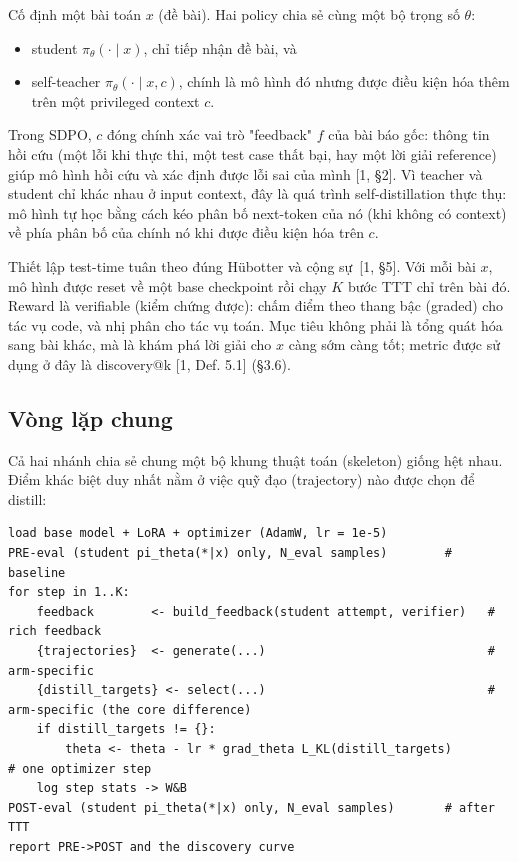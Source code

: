 Cố định một bài toán \(x\) (đề bài). Hai policy chia sẻ cùng một bộ trọng số \(\theta\):

\begin{itemize}
\tightlist
\item
  student \(\pi_\theta(\cdot \mid x)\), chỉ tiếp nhận đề bài, và
\item
  self-teacher \(\pi_\theta(\cdot \mid x, c)\), chính là mô hình đó nhưng được điều kiện hóa thêm trên một privileged context \(c\).
\end{itemize}

Trong SDPO, \(c\) đóng chính xác vai trò "feedback" \(f\) của bài báo gốc: thông tin hồi cứu (một lỗi khi thực thi, một test case thất bại, hay một lời giải reference) giúp mô hình hồi cứu và xác định được lỗi sai của mình {[}1, §2{]}. Vì teacher và student chỉ khác nhau ở input context, đây là quá trình self-distillation thực thụ: mô hình tự học bằng cách kéo phân bố next-token của nó (khi không có context) về phía phân bố của chính nó khi được điều kiện hóa trên \(c\).

Thiết lập test-time tuân theo đúng Hübotter và cộng sự~{[}1, §5{]}. Với mỗi bài \(x\), mô hình được reset về một base checkpoint rồi chạy \(K\) bước TTT chỉ trên bài đó. Reward là verifiable (kiểm chứng được): chấm điểm theo thang bậc (graded) cho tác vụ code, và nhị phân cho tác vụ toán. Mục tiêu không phải là tổng quát hóa sang bài khác, mà là khám phá lời giải cho \(x\) càng sớm càng tốt; metric được sử dụng ở đây là discovery@k {[}1, Def. 5.1{]} (§3.6).

\subsection{Vòng lặp chung}\label{the-shared-loop}

Cả hai nhánh chia sẻ chung một bộ khung thuật toán (skeleton) giống hệt nhau. Điểm khác biệt duy nhất nằm ở việc quỹ đạo (trajectory) nào được chọn để distill:

\begin{lstlisting}
load base model + LoRA + optimizer (AdamW, lr = 1e-5)
PRE-eval (student pi_theta(*|x) only, N_eval samples)        # baseline
for step in 1..K:
    feedback        <- build_feedback(student attempt, verifier)   # rich feedback
    {trajectories}  <- generate(...)                               # arm-specific
    {distill_targets} <- select(...)                               # arm-specific (the core difference)
    if distill_targets != {}:
        theta <- theta - lr * grad_theta L_KL(distill_targets)                    # one optimizer step
    log step stats -> W&B
POST-eval (student pi_theta(*|x) only, N_eval samples)       # after TTT
report PRE->POST and the discovery curve
\end{lstlisting}

